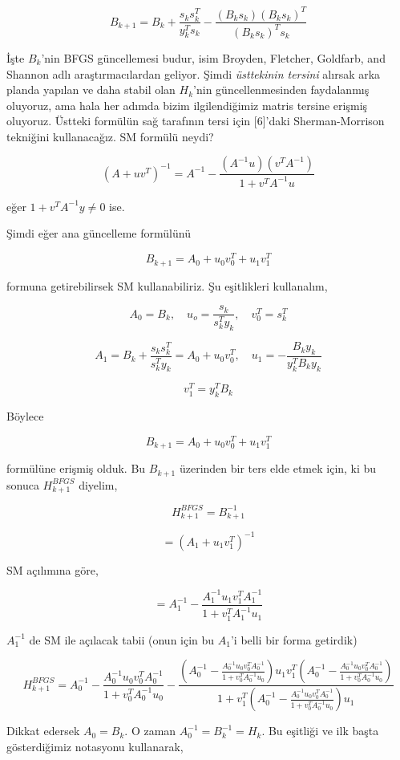 \documentclass[12pt,fleqn]{article}\usepackage{../../common}
\begin{document}
$$
B_{k+1} = B_k + \frac{s_ks_k^T}{y_k^Ts_k} - \frac{(B_k s_k)(B_k s_k)^T}{(B_ks_k)^Ts_k}
$$

İşte $B_k$'nin BFGS güncellemesi budur, isim Broyden, Fletcher, Goldfarb,
and Shannon adlı araştırmacılardan geliyor. Şimdi {\em üsttekinin tersini}
alırsak arka planda yapılan ve daha stabil olan $H_k$'nin güncellenmesinden
faydalanmış oluyoruz, ama hala her adımda bizim ilgilendiğimiz matris
tersine erişmiş oluyoruz. Üstteki formülün sağ tarafının tersi için
[6]'daki Sherman-Morrison tekniğini kullanacağız. SM formülü neydi?

$$
(A+uv^T)^{-1} = A ^{-1} - \frac{(A^{-1} u)(v^TA^{-1})}{1 + v^T A^{-1} u}
$$

eğer $1+v^TA ^{-1} y \ne 0$ ise.

Şimdi eğer ana güncelleme formülünü 

$$
B_{k+1} = A_0 + u_0v_0^T + u_1v_1^T
$$

formuna getirebilirsek SM kullanabiliriz. Şu eşitlikleri kullanalım, 

$$
A_0 = B_k, \quad u_o = \frac{s_k}{s_k^Ty_k}, \quad v_0^T = s_k^T
$$
 
$$
A_1 = B_k + \frac{s_k s_k^T}{s_k^Ty_k} = A_0 + u_0v_0^T, \quad 
u_1 = -\frac{B_k y_k}{y_k^TB_ky_k}
$$

$$
v_1^T = y_k^T B_k
$$

Böylece 

$$
B_{k+1} = A_0 + u_0v_0^T + u_1v_1^T
$$

formülüne erişmiş olduk. Bu $B_{k+1}$ üzerinden bir ters elde etmek için,
ki bu sonuca $H_{k+1}^{BFGS}$ diyelim, 

$$
H_{k+1}^{BFGS} = B_{k+1}^{-1} 
$$

$$
= (A_1 + u_1v_1^T)^{-1} 
$$

SM açılımına göre,

$$
= A_1^{-1} - \frac{A_1^{-1}u_1v_1^TA_1^{-1}}{1+v_1^TA_1^{-1}u_1 }
$$

$A_1^{-1}$ de SM ile açılacak tabii (onun için bu $A_1$'i belli bir forma
getirdik)

$$
H_{k+1}^{BFGS} = 
A_0^{-1} - \frac{A_0^{-1} u_0v_0^T A_0^{-1}}{1+v_0^TA_0^{-1}u_0 } -
\frac
  {
    (A_0^{-1} - \frac{A_0^{-1} u_0v_0^T A_0^{-1}}{1+v_0^TA_0^{-1}u_0})
     u_1v_1^T
    (A_0^{-1} - \frac{A_0^{-1} u_0v_0^T A_0^{-1}}{1+v_0^TA_0^{-1}u_0})
   }
  {1 + v_1^T (A_0^{-1} - \frac{A_0^{-1} u_0v_0^T A_0^{-1}}{1+v_0^TA_0^{-1}u_0})u_1}
$$

Dikkat edersek $A_0 = B_k$. O zaman $A_0^{-1} = B_k^{-1} = H_k$. Bu
eşitliği ve ilk başta gösterdiğimiz notasyonu kullanarak, 
\end{document}
